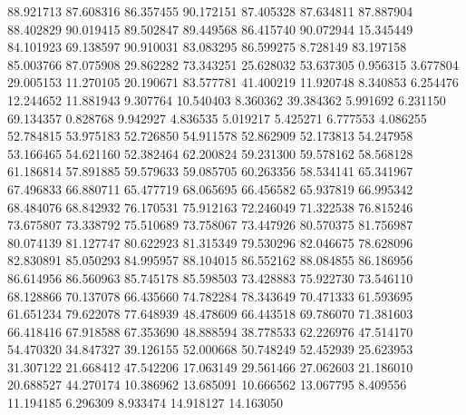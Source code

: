 88.921713
87.608316
86.357455
90.172151
87.405328
87.634811
87.887904
88.402829
90.019415
89.502847
89.449568
86.415740
90.072944
15.345449
84.101923
69.138597
90.910031
83.083295
86.599275
8.728149
83.197158
85.003766
87.075908
29.862282
73.343251
25.628032
53.637305
0.956315
3.677804
29.005153
11.270105
20.190671
83.577781
41.400219
11.920748
8.340853
6.254476
12.244652
11.881943
9.307764
10.540403
8.360362
39.384362
5.991692
6.231150
69.134357
0.828768
9.942927
4.836535
5.019217
5.425271
6.777553
4.086255
52.784815
53.975183
52.726850
54.911578
52.862909
52.173813
54.247958
53.166465
54.621160
52.382464
62.200824
59.231300
59.578162
58.568128
61.186814
57.891885
59.579633
59.085705
60.263356
58.534141
65.341967
67.496833
66.880711
65.477719
68.065695
66.456582
65.937819
66.995342
68.484076
68.842932
76.170531
75.912163
72.246049
71.322538
76.815246
73.675807
73.338792
75.510689
73.758067
73.447926
80.570375
81.756987
80.074139
81.127747
80.622923
81.315349
79.530296
82.046675
78.628096
82.830891
85.050293
84.995957
88.104015
86.552162
88.084855
86.186956
86.614956
86.560963
85.745178
85.598503
73.428883
75.922730
73.546110
68.128866
70.137078
66.435660
74.782284
78.343649
70.471333
61.593695
61.651234
79.622078
77.648939
48.478609
66.443518
69.786070
71.381603
66.418416
67.918588
67.353690
48.888594
38.778533
62.226976
47.514170
54.470320
34.847327
39.126155
52.000668
50.748249
52.452939
25.623953
31.307122
21.668412
47.542206
17.063149
29.561466
27.062603
21.186010
20.688527
44.270174
10.386962
13.685091
10.666562
13.067795
8.409556
11.194185
6.296309
8.933474
14.918127
14.163050
